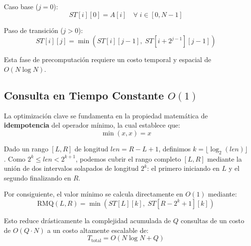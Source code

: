 \documentclass[twocolumn]{article}
\begin{document}
Caso base ($j = 0$):
\begin{equation}
ST[i][0] = A[i] \quad \forall \; i \in [0, N-1]
\end{equation}

Paso de transición ($j > 0$):
\begin{equation}
ST[i][j] = \min\left( ST[i][j-1], \; ST[i + 2^{j-1}][j-1] \right)
\end{equation}

Esta fase de precomputación requiere un costo temporal y espacial de $O(N \log N)$.

\subsection{Consulta en Tiempo Constante $O(1)$}
La optimización clave se fundamenta en la propiedad matemática de \textbf{idempotencia} del operador mínimo, la cual establece que:
\begin{equation}
\min(x, x) = x
\end{equation}

Dado un rango $[L, R]$ de longitud $len = R - L + 1$, definimos $k = \lfloor \log_2(len) \rfloor$. Como $2^k \le len < 2^{k+1}$, podemos cubrir el rango completo $[L, R]$ mediante la unión de dos intervalos solapados de longitud $2^k$: el primero iniciando en $L$ y el segundo finalizando en $R$.

Por consiguiente, el valor mínimo se calcula directamente en $O(1)$ mediante:
\begin{equation}
\text{RMQ}(L, R) = \min\left( ST[L][k], \; ST[R - 2^k + 1][k] \right)
\end{equation}

Esto reduce drásticamente la complejidad acumulada de $Q$ consultas de un costo de $O(Q \cdot N)$ a un costo altamente escalable de:
\begin{equation}
T_{\text{total}} = O(N \log N + Q)
\end{equation}
\end{document}

